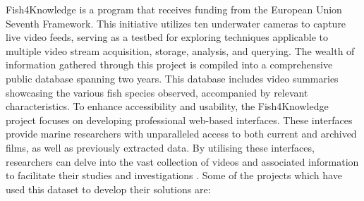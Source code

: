 Fish4Knowledge is a program that receives funding from the European Union Seventh Framework. This initiative utilizes ten underwater cameras to capture live video feeds, serving as a testbed for exploring techniques applicable to multiple video stream acquisition, storage, analysis, and querying. The wealth of information gathered through this project is compiled into a comprehensive public database spanning two years. This database includes video summaries showcasing the various fish species observed, accompanied by relevant characteristics. To enhance accessibility and usability, the Fish4Knowledge project focuses on developing professional web-based interfaces. These interfaces provide marine researchers with unparalleled access to both current and archived films, as well as previously extracted data. By utilising these interfaces, researchers can delve into the vast collection of videos and associated information to facilitate their studies and investigations \cite{fisher2016fish4knowledge}. Some of the projects which have used this dataset to develop their solutions are:

